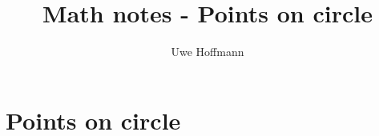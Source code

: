 

\title{Math notes - Points on circle}
\author{Uwe Hoffmann}



\setcounter{chapter}{1}
\chapter*{Points on circle}

